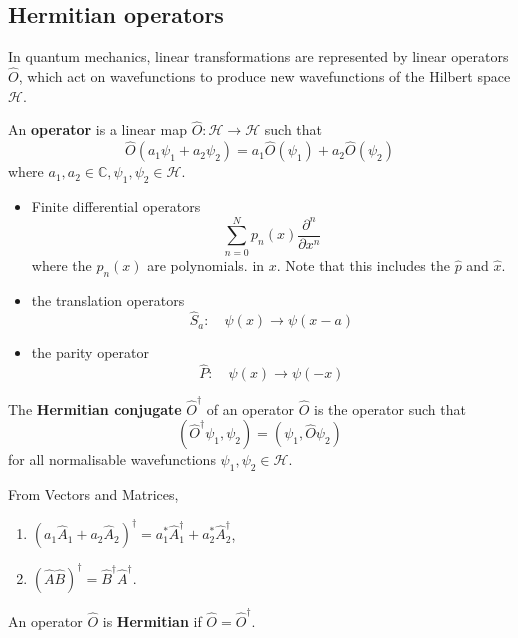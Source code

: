 \documentclass[a4paper,11pt]{article}
\begin{document}
\subsection{Hermitian operators}
In quantum mechanics, linear transformations are represented by linear operators $\hat{O}$, which act on wavefunctions to produce new wavefunctions of the Hilbert space $\mathcal{H}$.

\begin{definition}
	An \textbf{operator} is a linear map \(\hat{O}: \mathcal H \to \mathcal H \) such that
	\[
		\hat O(a_1 \psi_1 + a_2 \psi_2) = a_1 \hat O(\psi_1) + a_2 \hat O(\psi_2)
	\]
	where \( a_1, a_2 \in \mathbb C, \psi_1, \psi_2 \in \mathcal H \).
\end{definition}

\begin{example}
\begin{itemize}
    \item Finite differential operators
    \[
    \sum_{n=0}^N p_n(x) \frac{\partial^n}{\partial x^n}
    \]
    where the $p_n(x)$ are polynomials. in $x$. Note that this includes the $\hat{p}$ and $\hat{x}$.
    \item the translation operators
    \[
    \hat{S}_a: \quad \psi(x) \rightarrow \psi(x-a)
    \]
    \item the parity operator
    \[
    \hat P: \quad \psi(x) \rightarrow \psi(-x)
    \]
\end{itemize}
\end{example}

\begin{definition}
    The \textbf{Hermitian conjugate} $\hat{O}^{\dagger}$ of an operator $\hat{O}$ is the operator such that
    \[
    \left(\hat{O}^{\dagger} \psi_1, \psi_2\right)=\left(\psi_1, \hat{O} \psi_2\right)
    \]
    for all normalisable wavefunctions $\psi_1, \psi_2 \in \mathcal{H}$.
\end{definition}
From Vectors and Matrices, 
\begin{enumerate}
    \item $\left(a_1 \hat{A}_1+a_2 \hat{A}_2\right)^{\dagger}=a_1^* \hat{A}_1^{\dagger}+a_2^* \hat{A}_2^{\dagger}$,
    \item $(\hat{A} \hat{B})^{\dagger}=\hat{B}^{\dagger} \hat{A}^{\dagger}$.
\end{enumerate}
\begin{definition}
    An operator $ \hat{O} $ is \textbf{Hermitian} if $ \hat{O} = \hat{O}^{\dagger} $.
\end{definition}
\end{document}
